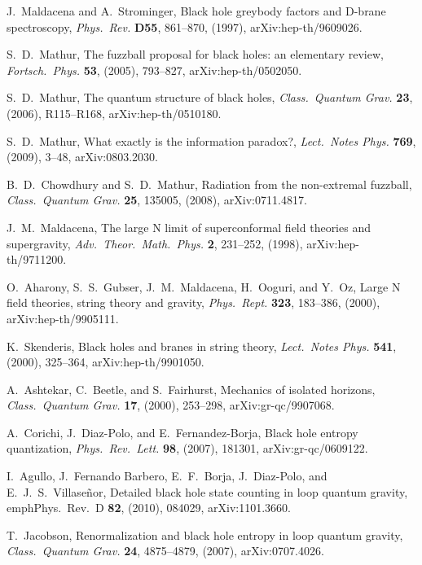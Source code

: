\documentclass[11pt]{article}
\begin{document}
\begin{thebibliography}{999}
 J.~Maldacena and A.~Strominger, Black hole greybody 
factors and D-brane spectroscopy, \emph{Phys.\ Rev.} {\bf  D55}, 
861--870, (1997), arXiv:hep-th/9609026.

  S.~D.\ Mathur, The fuzzball proposal for black holes: 
an elementary review, \emph{Fortsch.\ Phys.} {\bf 53}, (2005),
793--827, arXiv:hep-th/0502050.

 S.~D.\ Mathur, The quantum structure of black holes,
\emph{Class.\ Quantum Grav.} {\bf 23}, (2006), R115--R168,
arXiv:hep-th/0510180.

 S.~D.\ Mathur, What exactly is the information 
paradox?, \emph{Lect.\ Notes Phys.} {\bf 769}, (2009), 3--48,
arXiv:0803.2030.

 B.~D.\ Chowdhury and S.~D.\ Mathur,
Radiation from the non-extremal fuzzball, \emph{Class.\ Quantum 
Grav.} {\bf 25}, 135005, (2008), arXiv:0711.4817.

 J.~M.\ Maldacena, The large N limit of superconformal 
field theories and supergravity, \emph{Adv.\ Theor.\ Math.\ Phys.}
{\bf 2},  231--252, (1998), arXiv:hep-th/9711200.

 O.\ Aharony, S.~S.\ Gubser, J.~M.\ Maldacena, H.\
Ooguri, and Y.\ Oz, Large N field theories, string theory and gravity,
\emph{Phys.\ Rept.} {\bf 323}, 183--386, (2000), arXiv:hep-th/9905111. 

 K.\ Skenderis, Black holes and branes in string 
theory, \emph{Lect.\ Notes Phys.} {\bf 541}, (2000), 325--364,
arXiv:hep-th/9901050.

 A.\ Ashtekar, C.\ Beetle, and S.\ Fairhurst,
Mechanics of isolated horizons, \emph{Class.\ Quantum Grav.} {\bf 17}, 
(2000), 253--298, arXiv:gr-qc/9907068.

 A.~Corichi,  J.\ Diaz-Polo, and E.~Fernandez-Borja,
Black hole entropy quantization, \emph{Phys.\ Rev.\ Lett.} {\bf 98},
 (2007), 181301,  arXiv:gr-qc/0609122.

 I.\ Agullo, J.~Fernando Barbero, E.~F.\ Borja, J.\ Diaz-Polo,
and E.~J.~S.\ Villase{\~n}or, Detailed black hole state counting in loop 
quantum gravity, emph{Phys.\ Rev.\ D} {\bf 82}, (2010), 084029,
arXiv:1101.3660.

 T.\ Jacobson, Renormalization and black hole 
entropy in loop quantum gravity, \emph{Class.\ Quantum Grav.} {\bf 24},
4875--4879,  (2007),  arXiv:0707.4026.


\end{thebibliography}
\end{document}
